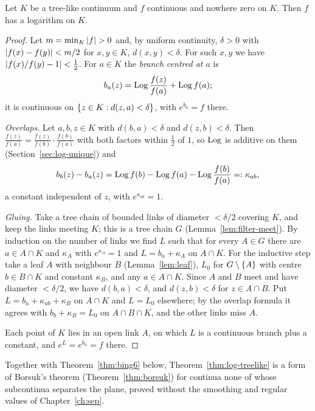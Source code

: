 \begin{theorem}\label{thm:log-treelike}
Let $K$ be a tree-like continuum and $f$ continuous and nowhere zero on $K$. Then $f$ has a logarithm
on $K$.
\end{theorem}

\begin{proof}
Let $m=\min_K\left\lvert f\right\rvert>0$ and, by uniform continuity, $\delta>0$ with $\left\lvert f(x)-f(y)\right\rvert<m/2$ for $x,y\in K$,
$d(x,y)<\delta$. For such $x,y$ we have $\left\lvert f(x)/f(y)-1\right\rvert<\frac12$. For $a\in K$ the \emph{branch
centred at $a$} is
\[
b_a(z)=\operatorname{Log}\frac{f(z)}{f(a)}+\operatorname{Log} f(a);
\]
it is continuous on $\left\{ z\in K:d(z,a)<\delta \right\}$, with $e^{b_a}=f$ there.

\emph{Overlaps.} Let $a,b,z\in K$ with $d(b,a)<\delta$ and $d(z,b)<\delta$. Then
$\frac{f(z)}{f(a)}=\frac{f(z)}{f(b)}\cdot\frac{f(b)}{f(a)}$ with both factors within $\frac12$ of $1$, so
$\operatorname{Log}$ is additive on them (Section~\ref{sec:log-unique}) and
\[
b_b(z)-b_a(z)=\operatorname{Log} f(b)-\operatorname{Log} f(a)-\operatorname{Log}\frac{f(b)}{f(a)}=:\kappa_{ab},
\]
a constant independent of $z$, with $e^{\kappa_{ab}}=1$.

\emph{Gluing.} Take a tree chain of bounded links of diameter $<\delta/2$ covering $K$, and keep the
links meeting $K$; this is a tree chain $G$ (Lemma~\ref{lem:filter-meet}). By induction on the number
of links we find $L$ such that for every $A\in G$ there are $a\in A\cap K$ and $\kappa_A$ with
$e^{\kappa_A}=1$ and $L=b_a+\kappa_A$ on $A\cap K$. For the inductive step take a leaf $A$ with
neighbour $B$ (Lemma~\ref{lem:leaf}), $L_0$ for $G\setminus\left\{ A \right\}$ with centre $b\in B\cap K$ and
constant $\kappa_B$, and any $a\in A\cap K$. Since $A$ and $B$ meet and have diameter $<\delta/2$, we have
$d(b,a)<\delta$, and $d(z,b)<\delta$ for $z\in A\cap B$. Put $L=b_a+\kappa_{ab}+\kappa_B$ on $A\cap K$ and
$L=L_0$ elsewhere; by the overlap formula it agrees with $b_b+\kappa_B=L_0$ on $A\cap B\cap K$, and
the other links miss $A$.

Each point of $K$ lies in an open link $A$, on which $L$ is a continuous branch plus a constant, and
$e^L=e^{b_a}=f$ there.
\end{proof}


Together with Theorem~\ref{thm:bing6} below, Theorem~\ref{thm:log-treelike} is a form of Borsuk's
theorem (Theorem~\ref{thm:borsuk}) for continua none of whose subcontinua separates the plane, proved
without the smoothing and regular values of Chapter~\ref{ch:sep}.

